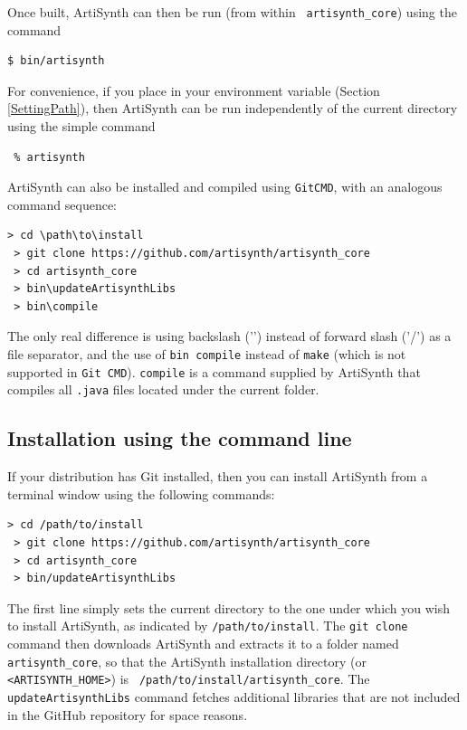 Once built, ArtiSynth can then be run (from within {\tt
artisynth\_core}) using the command
%
\begin{lstlisting}[]
  $ bin/artisynth
\end{lstlisting}
%
\begin{sideblock}
For convenience, if you place  in your \PATH{}
environment variable (Section \ref{SettingPath}), 
then ArtiSynth can be run independently of the current
directory using the simple command
\begin{verbatim}
 % artisynth
\end{verbatim}
\end{sideblock}

ArtiSynth can also be installed and compiled using {\tt GitCMD},
with an analogous command sequence:
%
\begin{lstlisting}[]
 > cd \path\to\install
 > git clone https://github.com/artisynth/artisynth_core
 > cd artisynth_core
 > bin\updateArtisynthLibs
 > bin\compile
\end{lstlisting}
%
The only real difference is using backslash ('\BKS ') instead of
forward slash ('/') as a file separator, and the use of {\tt bin\BKS
compile} instead of {\tt make} (which is not supported in {\tt Git
CMD}). {\tt compile} is a command supplied by ArtiSynth that compiles
all {\tt .java} files located under the current folder.
\else %
\subsection{Installation using the command line}

If your \SYSTEM{} distribution has Git installed, then you can
install ArtiSynth from a terminal window using the following
commands:
%
\begin{lstlisting}[]
 > cd /path/to/install
 > git clone https://github.com/artisynth/artisynth_core
 > cd artisynth_core
 > bin/updateArtisynthLibs
\end{lstlisting}
%
The first line simply sets the current directory to the one under which
you wish to install ArtiSynth, as indicated by {\tt /path/to/install}.
The {\tt git clone} command then downloads ArtiSynth and extracts it
to a folder named {\tt artisynth\_core}, so that the ArtiSynth
installation directory (or {\tt <ARTISYNTH\_HOME>}) is {\tt
/path/to/install/artisynth\_core}. The {\tt updateArtisynthLibs}
command fetches additional libraries that are not included in the
GitHub repository for space reasons.
\ifMacOS

